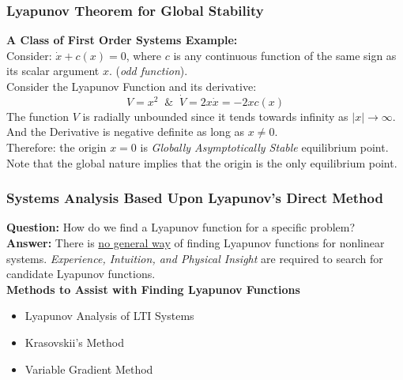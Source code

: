 \documentclass[11pt,handout]{beamer}   %
\begin{document}
\begin{frame}
\frametitle{Lyapunov Theorem for Global Stability}
\textbf{A Class of First Order Systems Example:}\\
Consider: $\dot{x} + c(x) = 0$, where $c$ is any continuous function of the same sign as its scalar argument $x$. (\textit{odd function}).\\
\vspace{6pt}
Consider the Lyapunov Function and its derivative:
\begin{equation*}
V = x^2 \;\; \& \;\; \dot{V} = 2 x \dot{x} = -2xc(x)
\end{equation*}
The function $V$ is radially unbounded since it tends towards infinity as $|x| \rightarrow \infty$. And the Derivative is negative definite as long as $x \neq 0$.\\
\vspace{6pt}
Therefore: the origin $x=0$ is \textit{Globally Asymptotically Stable} equilibrium point.\\
Note that the global nature implies that the origin is the only equilibrium point.
\end{frame}

\begin{frame}
\frametitle{Systems Analysis Based Upon Lyapunov's Direct  Method}
\textbf{Question:} How do we find a Lyapunov function for a specific problem?\\
\textbf{Answer:} There is \underline{no general way} of finding Lyapunov functions for nonlinear systems. \textit{Experience, Intuition, and Physical Insight} are required to search for candidate Lyapunov functions.\\
\vspace{6pt}
\textbf{Methods to Assist with Finding Lyapunov Functions}
\begin{itemize}
\item Lyapunov Analysis of LTI Systems
\item Krasovskii's Method
\item Variable Gradient Method
\end{itemize}
\end{frame}
\end{document}
